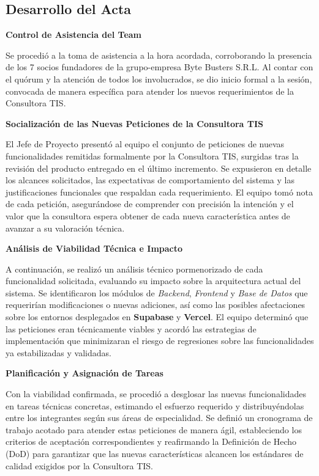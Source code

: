 \newpage
\subsection{Desarrollo del Acta}

\noindent \textbf{Control de Asistencia del Team}\par
Se procedió a la toma de asistencia a la hora acordada, corroborando la presencia de los 7 socios fundadores de la grupo-empresa Byte Busters S.R.L. Al contar con el quórum y la atención de todos los involucrados, se dio inicio formal a la sesión, convocada de manera específica para atender los nuevos requerimientos de la Consultora TIS.

\vspace*{0.5cm}
\noindent \textbf{Socialización de las Nuevas Peticiones de la Consultora TIS}\par
El Jefe de Proyecto presentó al equipo el conjunto de peticiones de nuevas funcionalidades remitidas formalmente por la Consultora TIS, surgidas tras la revisión del producto entregado en el último incremento. Se expusieron en detalle los alcances solicitados, las expectativas de comportamiento del sistema y las justificaciones funcionales que respaldan cada requerimiento. El equipo tomó nota de cada petición, asegurándose de comprender con precisión la intención y el valor que la consultora espera obtener de cada nueva característica antes de avanzar a su valoración técnica.

\vspace*{0.5cm}
\noindent \textbf{Análisis de Viabilidad Técnica e Impacto}\par
A continuación, se realizó un análisis técnico pormenorizado de cada funcionalidad solicitada, evaluando su impacto sobre la arquitectura actual del sistema. Se identificaron los módulos de \textit{Backend}, \textit{Frontend} y \textit{Base de Datos} que requerirían modificaciones o nuevas adiciones, así como las posibles afectaciones sobre los entornos desplegados en \textbf{Supabase} y \textbf{Vercel}. El equipo determinó que las peticiones eran técnicamente viables y acordó las estrategias de implementación que minimizaran el riesgo de regresiones sobre las funcionalidades ya estabilizadas y validadas.

\vspace*{0.5cm}
\noindent \textbf{Planificación y Asignación de Tareas}\par
Con la viabilidad confirmada, se procedió a desglosar las nuevas funcionalidades en tareas técnicas concretas, estimando el esfuerzo requerido y distribuyéndolas entre los integrantes según sus áreas de especialidad. Se definió un cronograma de trabajo acotado para atender estas peticiones de manera ágil, estableciendo los criterios de aceptación correspondientes y reafirmando la Definición de Hecho (DoD) para garantizar que las nuevas características alcancen los estándares de calidad exigidos por la Consultora TIS.

